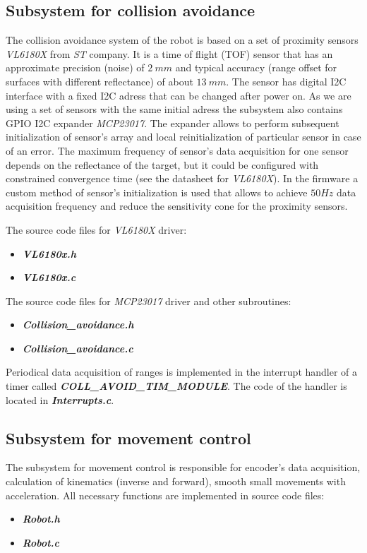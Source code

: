 \documentclass[a4paper,12pt]{article} %
\newcommand{\textitbf}[1]{\textbf{\textit{#1}}}
\begin{document}
\subsection{Subsystem for collision avoidance}
The collision avoidance system of the robot is based on a set of proximity sensors \textit{VL6180X} from \textit{ST} company. It is a time of flight (TOF) sensor that has an approximate precision (noise) of $2\:mm$ and typical accuracy (range offset for surfaces with different reflectance) of about $13\:mm$. The sensor has digital I2C interface with a fixed I2C adress that can be changed after power on. As we are using a set of sensors with the same initial adress the subsystem also contains GPIO I2C expander \textit{MCP23017}. The expander allows to perform subsequent initialization of sensor's array and local reinitialization of particular sensor in case of an error. The maximum frequency of sensor's data acquisition for one sensor depends on the reflectance of the target, but it could be configured with constrained convergence time (see the datasheet for \textit{VL6180X}). In the firmware a custom method of sensor's initialization is used that allows to achieve $50 Hz$ data acquisition frequency and reduce the sensitivity cone for the proximity sensors. 

The source code files for  \textit{VL6180X} driver:
\begin{itemize}
	\item \textbf{\textit{VL6180x.h}}
	\item \textbf{\textit{VL6180x.c}}
\end{itemize}

The source code files for  \textit{MCP23017} driver and other subroutines:
\begin{itemize}
	\item \textbf{\textit{Collision\_avoidance.h}}
	\item \textbf{\textit{Collision\_avoidance.c}}
\end{itemize}

Periodical data acquisition of ranges is implemented in the interrupt handler of a timer called \textbf{\textit{COLL\_AVOID\_TIM\_MODULE}}. The code of the handler is located in \textbf{\textit{Interrupts.c}}.

\subsection{Subsystem for movement control}
The subsystem for movement control is responsible for encoder's data acquisition, calculation of kinematics (inverse and forward), smooth small movements with acceleration. All necessary functions are implemented in source code files:
\begin{itemize}
	\item \textitbf{Robot.h}
	\item \textitbf{Robot.c}
\end{itemize}
\end{document}
